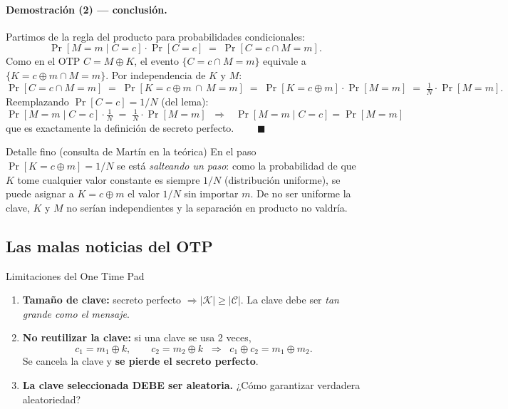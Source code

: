 \documentclass[11pt,a4paper]{article}
\newcommand{\Kset}{\mathcal{K}}
\newcommand{\Cset}{\mathcal{C}}
\newcommand{\xor}{\oplus}
\begin{document}
\paragraph{Demostración (2) — conclusión.}
Partimos de la regla del producto para probabilidades condicionales:
\[
  \Pr[M=m\mid C=c]\cdot\Pr[C=c] \;=\; \Pr[C=c\cap M=m].
\]
Como en el OTP $C=M\xor K$, el evento $\{C=c\cap M=m\}$ equivale a $\{K=c\xor m\cap M=m\}$.
Por independencia de $K$ y $M$:
\[
  \Pr[C=c\cap M=m]\;=\;\Pr[K=c\xor m\,\cap\, M=m]
  \;=\;\Pr[K=c\xor m]\cdot\Pr[M=m] \;=\; \tfrac1N\cdot\Pr[M=m].
\]
Reemplazando $\Pr[C=c]=1/N$ (del lema):
\[
  \Pr[M=m\mid C=c]\cdot \tfrac1N \;=\; \tfrac1N\cdot\Pr[M=m]
  \;\;\Longrightarrow\;\;
  \boxed{\ \Pr[M=m\mid C=c]=\Pr[M=m]\ }
\]
que es exactamente la definición de secreto perfecto. $\qquad\blacksquare$

\begin{practbox}{Detalle fino (consulta de Martín en la teórica)}
En el paso $\Pr[K=c\xor m]=1/N$ se está \emph{salteando un paso}: como la probabilidad de
que $K$ tome cualquier valor constante es siempre $1/N$ (distribución uniforme), se puede
asignar a $K=c\xor m$ el valor $1/N$ sin importar $m$. De no ser uniforme la clave, $K$ y
$M$ no serían independientes y la separación en producto no valdría.
\end{practbox}

\subsection{Las malas noticias del OTP}

\begin{warnbox}{Limitaciones del One Time Pad}
\begin{enumerate}[leftmargin=1.5em,itemsep=2pt]
  \item \textbf{Tamaño de clave:} secreto perfecto $\Rightarrow |\Kset|\ge|\Cset|$. La
        clave debe ser \emph{tan grande como el mensaje}.
  \item \textbf{No reutilizar la clave:} si una clave se usa 2 veces,
        \[
          c_1 = m_1\xor k,\qquad c_2 = m_2\xor k
          \;\;\Longrightarrow\;\; c_1\xor c_2 = m_1\xor m_2.
        \]
        Se cancela la clave y \textbf{se pierde el secreto perfecto}.
  \item \textbf{La clave seleccionada DEBE ser aleatoria.} ¿Cómo garantizar
        verdadera aleatoriedad?
\end{enumerate}
\end{warnbox}
\end{document}

